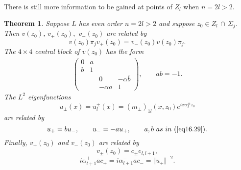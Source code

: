 \documentclass{surv-l}
\theoremstyle{plain}
\newtheorem{theorem}{Theorem}[section]
\theoremstyle{definition}
\numberwithin{equation}{chapter}
\begin{document}
There is still more information to be gained at points of $Z_{l}$ when $n=2l>2$.
\setcounter{theorem}{26}
\begin{theorem}\label{them16.27}
Suppose $L$  has even order $n=2l>2$ and suppose $ z_{0}\in Z_{l}\,\cap\,\Sigma_{j}$. Then $v(z_{0})$, $v_{+}(z_{0}),$ $v_{-}(z_{0})$ are related by
\setcounter{equation}{27}
\begin{equation}\label{eq16.28}
v(z_{0})\pi_{j}v_{+}(z_{0})=v_{-}(z_{0})v(z_{0})\pi_{j}.
\end{equation}
The $4\times 4$ central block of $v(z_{0})$ has the form
\begin{align}\label{eq16.29}
\left(\begin{array}{cccc}
0 & a &   &\\
b & 1 &   &\\
& & 0 & -\alpha\overline{b} \\
& & -\bar{\alpha}\bar{a} & 1
\end{array}\right),\qquad ab=-1.
\end{align}
The $L^{2}$ eigenfunctions
\begin{equation}\label{eq16.30}
u_{\pm}(x)=u_{l}^{\pm}(x)=(m_{\pm})_{1l}(x, z_{0})e^{ix\alpha_{l}^{\pm}z_{0}}
\end{equation}
are related by
\begin{equation}\label{eq16.31}
u_{+}=bu_{-},\qquad u_{-}=-au_{+},\qquad a,b\ as\ in\ (\ref{eq16.29}).
\end{equation}
Finally, $v_{+}(z_{0})$ and $v_{-}(z_{0})$ are related by
\begin{equation}\label{eq16.32}
v_{\pm}(z_{0})=c_{\pm} e_{l,l+1},
\end{equation}
\begin{equation}\label{eq16.33}
i\alpha_{l+1}^{+}\overline{a}c_{+}=i\alpha_{l+1}^{-}ac_{-}=\Vert u_{+}\Vert^{-2}.
\end{equation}
\end{theorem}
\end{document}

